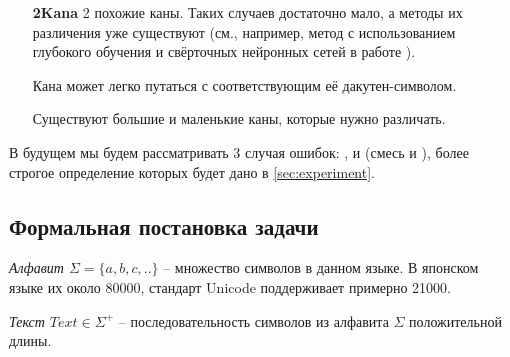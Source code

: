\begin{itemize}
	\item[\textbf{2Kana}] 2 похожие каны. Таких случаев достаточно мало, а методы их различения уже существуют (см., например, метод с использованием глубокого обучения и свёрточных нейронных сетей в работе \cite{tsai:dcnn}).
	\begin{figure}[H]
	\end{figure}

	\item[\KG] Кана может легко путаться с соответствующим её дакутен-символом.
	\begin{figure}[H]
	\end{figure}

	\item[\BS] Существуют большие и маленькие каны, которые нужно различать.
	\begin{figure}[H]
	\end{figure}
	
\end{itemize}

В будущем мы будем рассматривать 3 случая ошибок: \textbf{\KG}, \textbf{\BS} и \textbf{\MX} (смесь \textbf{\KG} и  \textbf{\BS} ), более строгое определение которых будет дано в \cref{sec:experiment}.

\subsection{ Формальная постановка задачи }

\begin{definition}
	{\textit{Алфавит $\Sigma = \{ a, b, c, .. \}$}} -- множество символов в данном языке. В японском языке их около 80000, стандарт Unicode поддерживает примерно 21000.
\end{definition}

\begin{definition}
	{\textit{Текст $Text \in \Sigma^+$}} -- последовательность символов из алфавита $\Sigma$ положительной длины.
\end{definition}

